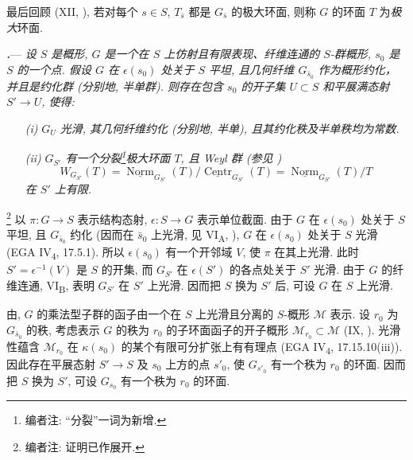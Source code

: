 最后回顾 (XII, ), 若对每个 \(s\in S\), \(T_{\bar s}\) 都是 \(G_{\bar s}\) 的极大环面, 则称 \(G\) 的环面 \(T\) 为\emph{极大}环面.

\par\medskip\noindent
{}\textbf{\textit{.}}---
\textit{设 \(S\) 是概形, \(G\) 是一个在 \(S\) 上仿射且有限表现、纤维连通的 \(S\)-群概形, \(s_0\) 是 \(S\) 的一个点. 假设 \(G\) 在 \(\epsilon(s_0)\) 处关于 \(S\) 平坦, 且几何纤维 \(G_{\bar s_0}\) 作为概形约化，并且是约化群 \textup{(分别地, 半单群)}. 则存在包含 \(s_0\) 的开子集 \(U\subset S\) 和平展满态射 \(S'\to U\), 使得:}
\begin{enumerate}
\item[\textit{\SGAInlineRefTarget{sga3:xix:theorem:2:5:item:i}(i)}]
\textit{\(G_U\) 光滑, 其几何纤维约化 \textup{(分别地, 半单)}, 且其约化秩及半单秩均为常数.}
\item[\textit{\SGAInlineRefTarget{sga3:xix:theorem:2:5:item:ii}(ii)}]
\textit{\(G_{S'}\) 有一个分裂\footnote{编者注: “分裂”一词为新增.}极大环面 \(T\), 且 Weyl 群 \textup{(参见 )}}
\[
  W_{G_{S'}}(T)
  =
  \underline{\operatorname{Norm}}_{G_{S'}}(T)/
  \underline{\operatorname{Centr}}_{G_{S'}}(T)
  =
  \underline{\operatorname{Norm}}_{G_{S'}}(T)/T
\]
\textit{在 \(S'\) 上有限.}
\end{enumerate}

\footnote{编者注: 证明已作展开.}
以 \(\pi\colon G\to S\) 表示结构态射, \(\epsilon\colon S\to G\) 表示单位截面. 由于 \(G\) 在 \(\epsilon(s_0)\) 处关于 \(S\) 平坦, 且 \(G_{\bar s_0}\) 约化 (因而在 \(\bar s_0\) 上光滑, 见 VI\textsubscript{A}, ), \(G\) 在 \(\epsilon(s_0)\) 处关于 \(S\) 光滑 (EGA IV\textsubscript{4}, 17.5.1). 所以 \(\epsilon(s_0)\) 有一个开邻域 \(V\), 使 \(\pi\) 在其上光滑. 此时 \(S'=\epsilon^{-1}(V)\) 是 \(S\) 的开集, 而 \(G_{S'}\) 在 \(\epsilon(S')\) 的各点处关于 \(S'\) 光滑. 由于 \(G\) 的纤维连通, VI\textsubscript{B},  表明 \(G_{S'}\) 在 \(S'\) 上光滑. 因而把 \(S\) 换为 \(S'\) 后, 可设 \(G\) 在 \(S\) 上光滑.

由, \(G\) 的乘法型子群的函子由一个在 \(S\) 上光滑且分离的 \(S\)-概形 \(\mathscr M\) 表示. 设 \(r_0\) 为 \(G_{\bar s_0}\) 的秩, 考虑表示 \(G\) 的秩为 \(r_0\) 的子环面函子的开子概形 \(\mathscr M_{r_0}\subset\mathscr M\) (IX, ). 光滑性蕴含 \(\mathscr M_{r_0}\) 在 \(\kappa(s_0)\) 的某个有限可分扩张上有有理点 (EGA IV\textsubscript{4}, 17.15.10(iii)). 因此存在平展态射 \(S'\to S\) 及 \(s_0\) 上方的点 \(s'_0\), 使 \(G_{s'_0}\) 有一个秩为 \(r_0\) 的环面. 因而把 \(S\) 换为 \(S'\), 可设 \(G_{s_0}\) 有一个秩为 \(r_0\) 的环面.

